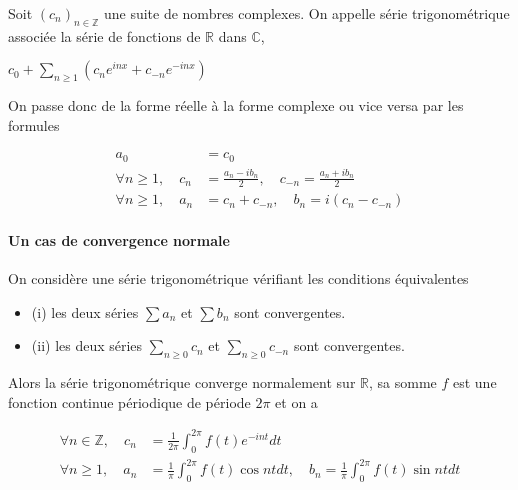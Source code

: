 \begin{de}
Soit $(c_n)_{n \in \mathbb{Z}}$ une
suite de nombres complexes. On appelle série trigonométrique associée la
série de fonctions de $\mathbb{R}$ dans $\mathbb{C}$,

$c_0 + \sum_{n \geq 1} (c_n e^{inx} + c_{-n} e^{-inx})$
\end{de}

On passe donc de la forme réelle à la forme complexe ou vice versa par
les formules

\begin{align*} 
a_0 &= c_0 \\
\forall n \geq 1, \quad c_n &= \frac{a_n - ib_n}{2}, \quad c_{-n} = \frac{a_n + ib_n}{2} \\
\forall n \geq 1, \quad a_n &= c_n + c_{-n}, \quad b_n = i(c_n - c_{-n})
\end{align*}

\paragraph{Un cas de convergence normale}

\begin{thm}
On considère une série trigonométrique vérifiant les
conditions équivalentes

\begin{itemize}
\itemsep1pt\parskip0pt
\item
  (i) les deux séries $\sum a_n$ et
  $\sum b_n$ sont convergentes.
\item
  (ii) les deux séries
  $\sum_{n \geq 0} c_n$ et
  $\sum_{n \geq 0} c_{-n}$ sont convergentes.
\end{itemize}

Alors la série trigonométrique converge normalement sur $\mathbb{R}$, sa somme $f$
est une fonction continue périodique de période $2\pi$ et on a

\begin{align*} 
\forall n \in \mathbb{Z}, \quad c_n &= \frac{1}{2\pi} \int_0^{2\pi} f(t) e^{-int} dt \\
\forall n \geq 1, \quad a_n &= \frac{1}{\pi} \int_0^{2\pi} f(t) \cos nt dt, \quad b_n = \frac{1}{\pi} \int_0^{2\pi} f(t) \sin nt dt
\end{align*}
\end{thm}

